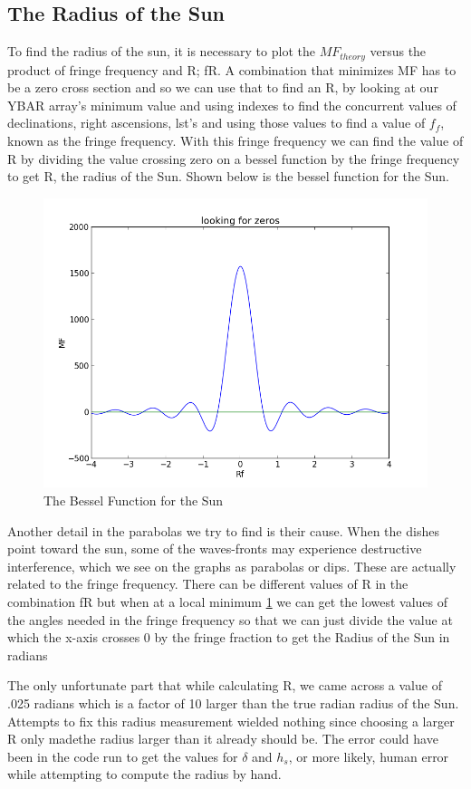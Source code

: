 \documentclass[12 pt]{article}
\begin{document}
\subsection*{The Radius of the Sun}
To find the radius of the sun, it is necessary to plot the $MF_{theory}$
versus the product of fringe frequency and R; fR. A combination that
minimizes MF has to be a zero cross section and so we can use that to
find an R, by looking at our YBAR array's minimum value and using
indexes to find the concurrent values of declinations, right ascensions,
lst's and using those values to find a value of $f_f$,  known as the
fringe frequency. With this fringe frequency we can find the value of R
by dividing the value crossing zero on a bessel function by the fringe
frequency to get R,  the radius of the Sun. Shown below is the bessel
function for the Sun. 
\begin{figure}[H]
\centering
\includegraphics[scale=0.5]{zerosR.png}
\caption{The Bessel Function for the Sun}
\label{zerosR}
\end{figure}
 Another detail in the parabolas we try to find is
their cause. When the dishes point toward the sun, some of the
waves-fronts may experience destructive interference, which we see on
the graphs as parabolas or dips. These are actually related to the
fringe frequency. There can be different values of R in the combination
fR but when at a local minimum \ref{zerosR} we can get the lowest
values of the angles needed in the fringe frequency so that we can just
divide the value at which the x-axis crosses 0 by the fringe fraction
to get the Radius of the Sun in radians \par
The only unfortunate part that while calculating R, we came across a
value of .025 radians which is a factor of 10 larger than the true
radian radius of the Sun. Attempts to fix this radius measurement
wielded nothing since choosing a larger R only madethe radius larger
than it already should be. The error could have been in the code run to
get the values for $\delta$ and $h_{s}$, or more likely, human error
while attempting to compute the radius by hand. 
\end{document}
